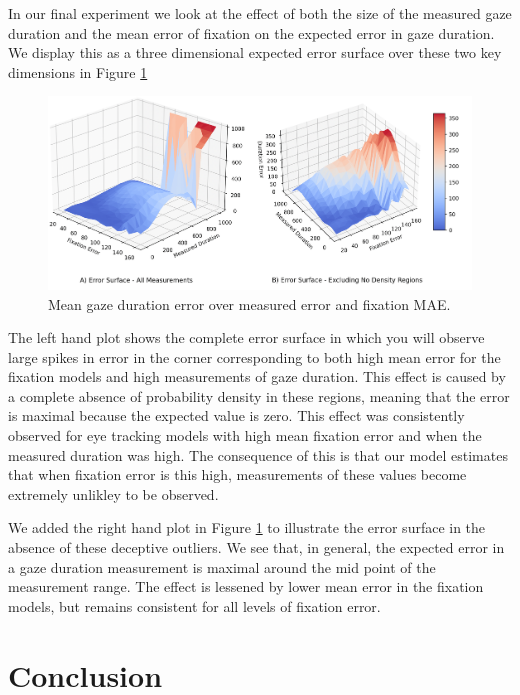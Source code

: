\documentclass[12pt,a4paper]{article}
\numberwithin{equation}{section}
\begin{document}
In our final experiment we look at the effect of both the size of the measured 
gaze duration and the mean error of fixation on the expected error in gaze duration.
We display this as a three dimensional expected error surface over these two key dimensions
in Figure \ref{fig:error_surface}

\begin{figure}[h!]
\centering
\includegraphics[scale=0.4]{../results/Error_surface.png}
\caption{Mean gaze duration error over measured error and fixation MAE.}
\label{fig:error_surface}
\end{figure}

The left hand plot shows the complete error surface in which you will observe large spikes in
error in the corner corresponding to both high mean error for the fixation models and 
high measurements of gaze duration. 
This effect is caused by a complete absence of probability density in these
regions, meaning that the error is maximal because the expected value is zero. This effect 
was consistently observed for 
eye tracking models with high mean fixation error and when the measured duration was high. 
The consequence of this is that our model estimates that when fixation error is this high, 
measurements of these values
become extremely unlikley to be observed.

We added the right hand plot in Figure \ref{fig:error_surface} to illustrate the error surface
in the absence of these deceptive outliers. We see that, in general, the expected error in a gaze
duration measurement is maximal around the mid point of the measurement range. The effect is lessened by 
lower mean error in the fixation models, but remains consistent for all levels of fixation error.

\section{Conclusion}
\end{document}
